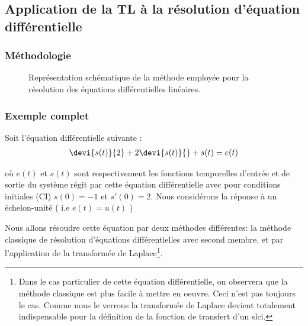\subsection[Application de la transformée de Laplace]{Application de la TL à la résolution d'équation différentielle}

\subsubsection{Méthodologie}
\acpl
{}
\begin{figure}[!h]
\begin{center}

\end{center}
\caption{Représentation schématique de la méthode employée pour la résolution
des équations différentielles linéaires.\label{fig-laplace_schema}}
\end{figure}


\subsubsection{Exemple complet}

Soit l'équation différentielle suivante :
\begin{align}
\devi{s(t)}{2}+2\devi{s(t)}{} + s(t) = e(t)\label{eq-diff1}
\end{align}

où $e(t)$ et $s(t)$ sont respectivement les fonctions temporelles d'entrée et de sortie du système
régit par cette équation différentielle avec pour conditions initiales (CI) 
$s(0)=-1$ et $s'(0)=2$.
Nous considérons la réponse à un échelon-unité ( i.e $e(t)=u(t)$ ) 

Nous allons résoudre cette équation par deux méthodes différentes: la méthode classique 
de résolution d'équations différentielles avec second membre, 
et par l'application de la transformée de Laplace\footnote{Dans le cas particulier
de cette équation différentielle, on observera que la méthode classique est plus 
facile à mettre en oeuvre. Ceci n'est pas toujours le cas. 
Comme nous le verrons la transformée de Laplace devient totalement indispensable pour la 
définition de la fonction de transfert d'un \gls{slci}.}.


